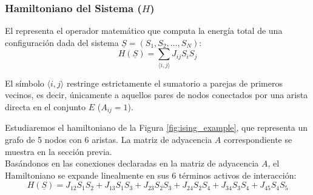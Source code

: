 \subsubsection{Hamiltoniano del Sistema ($H$)}
\noindent
\begin{definicion}
    El  representa el operador matemático que computa la energía total de una configuración dada del sistema $\underline{S} = (S_1, S_2, \dots, S_N)$:
    \[
    H(\underline{S}) = \sum_{\langle i,j \rangle} J_{ij} S_i S_j
    \]
\end{definicion}
\begin{notacion}    
    El símbolo $\langle i,j \rangle$ restringe estrictamente el sumatorio a parejas de primeros vecinos, es decir, únicamente a aquellos pares de nodos conectados por una arista directa en el conjunto $E$ ($A_{ij} = 1$).
\end{notacion}

\begin{ejemplo}
    Estudiaremos el hamiltoniano de la Figura \ref{fig:ising_example}, que representa un grafo de 5 nodos con 6 aristas. La matriz de adyacencia $A$ correspondiente se muestra en la sección previa. \\

    \noindent
    Basándonos en las conexiones declaradas en la matriz de adyacencia $A$, el Hamiltoniano se expande linealmente en sus 6 términos activos de interacción:
    \[
    H(\underline{S}) = J_{12}S_1S_2 + J_{13}S_1S_3 + J_{23}S_2S_3 + J_{24}S_2S_4 + J_{34}S_3S_4 + J_{45}S_4S_5
    \]
\end{ejemplo}


